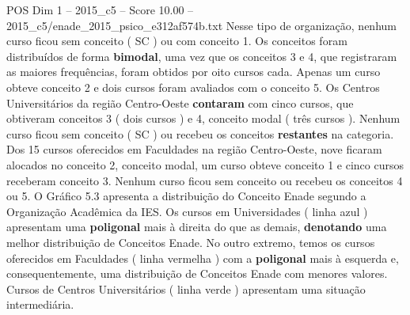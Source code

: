 \begin{textsample}{POS Dim 1 – 2015\_c5 – Score 10.00 – 2015\_c5/enade\_2015\_psico\_e312af574b.txt}
Nesse tipo de organização, nenhum curso ficou sem conceito ( SC ) ou com conceito 1.
Os conceitos foram distribuídos de forma \textbf{bimodal}, uma vez que os conceitos 3 e 4, que registraram as maiores frequências, foram obtidos por oito cursos cada.
Apenas um curso obteve conceito 2 e dois cursos foram avaliados com o conceito 5.
Os Centros Universitários da região Centro-Oeste \textbf{contaram} com cinco cursos, que obtiveram conceitos 3 ( dois cursos ) e 4, conceito modal ( três cursos ).
Nenhum curso ficou sem conceito ( SC ) ou recebeu os conceitos \textbf{restantes} na categoria.
Dos 15 cursos oferecidos em Faculdades na região Centro-Oeste, nove ficaram alocados no conceito 2, conceito modal, um curso obteve conceito 1 e cinco cursos receberam conceito 3.
Nenhum curso ficou sem conceito ou recebeu os conceitos 4 ou 5.
O Gráfico 5.3 apresenta a distribuição do Conceito Enade segundo a Organização Acadêmica da IES.
Os cursos em Universidades ( linha azul ) apresentam uma \textbf{poligonal} mais à direita do que as demais, \textbf{denotando} uma melhor distribuição de Conceitos Enade.
No outro extremo, temos os cursos oferecidos em Faculdades ( linha vermelha ) com a \textbf{poligonal} mais à esquerda e, consequentemente, uma distribuição de Conceitos Enade com menores valores.
Cursos de Centros Universitários ( linha verde ) apresentam uma situação intermediária.

\end{textsample}
